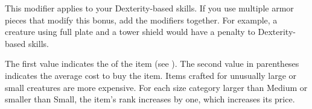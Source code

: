      This modifier applies to your Dexterity-based skills.
    If you use multiple armor pieces that modify this bonus, add the modifiers together.
    For example, a creature using full plate and a tower shield would have a  penalty to Dexterity-based skills.

     The first value indicates the  of the item (see ).
    The second value in parentheses indicates the average cost to buy the item.
    Items crafted for unusually large or small creatures are more expensive.
    For each size category larger than Medium or smaller than Small, the item's rank increases by one, which increases its price.

